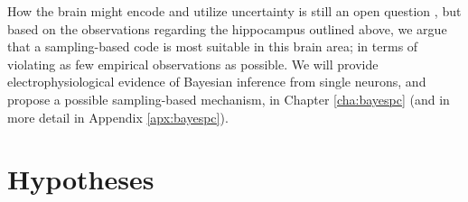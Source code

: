 \begin{itemize}

\end{itemize}

How the brain might encode and utilize uncertainty is still an open question \citep{pouget2013probabilistic}, but based on the observations regarding the hippocampus outlined above, we argue that a sampling-based code is most suitable in this brain area; in terms of violating as few empirical observations as possible. We will provide electrophysiological evidence of Bayesian inference from single neurons, and propose a possible sampling-based mechanism, in Chapter \ref{cha:bayespc} (and in more detail in Appendix \ref{apx:bayespc}).









\section{Hypotheses}
\label{sec:intro:hypotheses}

